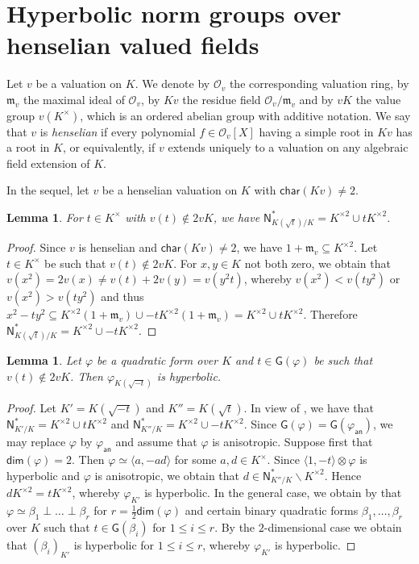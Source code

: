 \documentclass[twoside,11pt]{amsart}
\numberwithin{equation}{section}
\newtheorem{lem}[equation]{Lemma}
\theoremstyle{definition}
\renewcommand{\dim}{\operatorname{\mathsf{dim}}}
\newcommand\N{\operatorname{N}}
\newcommand{\car}{\mathsf{char}}
\newcommand{\mg}[1]{{#1}^{\times}}
\newcommand{\sq}[1]{{#1}^{\times 2}}
\newcommand{\la}{\langle}
\newcommand{\ra}{\rangle}
\newcommand{\an}{\mathsf{an}}
\renewcommand{\leq}{\leqslant}
\newcommand{\mc}{\mathcal}
\renewcommand{\N}{\mathsf{N}}
\newcommand{\G}{\mathsf{G}}
\renewcommand{\setminus}{\smallsetminus}
\renewcommand{\dim}{\mathsf{dim}}
\renewcommand{\leq}{\leqslant}
\newcommand{\mf}{\mathfrak}
\newcommand{\mfm}{\mf{m}}
\renewcommand{\setminus}{\smallsetminus}
\begin{document}
\section{Hyperbolic norm groups over henselian valued fields} %
\label{S:henselian-stuff}

Let $v$ be a valuation on $K$.
We denote by $\mc{O}_v$ the corresponding valuation ring, by $\mfm_v$ the maximal ideal of $\mc{O}_v$, by $Kv$ the residue field $\mc{O}_v/\mfm_v$ and by
$vK$ the value group $v(\mg{K})$, which is an ordered abelian group with additive notation.
We say that $v$ is \emph{henselian} if 
every polynomial $f\in\mc{O}_v[X]$ having a simple root in $Kv$ has a root in $K$, or equivalently, if $v$ extends uniquely to a valuation on any algebraic field extension of $K$.
\medskip

In the sequel, let $v$ be a henselian valuation on $K$ with $\car(Kv)\neq 2$.

\begin{lem}\label{rigid-norms}
    For $t\in\mg{K}$ with $v(t)\notin 2vK$, we have $\N_{K(\sqrt{t})/K}^\ast=\sq{K}\cup t\sq{K}$.
\end{lem}
\begin{proof}
    Since $v$ is henselian and $\car(Kv)\neq 2$, we have $1+\mfm_v\subseteq\sq{K}$.
    Let $t\in\mg{K}$ be such that $v(t)\notin 2vK$.
    For $x,y\in K$ not both zero, we obtain that $v(x^2)=2v(x)\neq v(t)+2v(y)=v(y^2t)$, whereby $v(x^2)<v(ty^2)$ or $v(x^2)>v(ty^2)$ and thus $x^2-ty^2\subseteq \sq{K}(1+\mfm_v)\cup -t\sq{K}(1+\mfm_v)=\sq{K}\cup t\sq{K}$.
    Therefore $\N_{K(\sqrt{t})/K}^\ast=\sq{K}\cup -t\sq{K}$.
\end{proof}

\begin{lem}\label{L:hens-rigid-simfactors}
    Let $\varphi$ be a quadratic form over $K$ and $t\in\G(\varphi)$ be such that 
    $v(t)\notin 2vK$. Then $\varphi_{K(\sqrt{-t})}$ is hyperbolic.
\end{lem}
\begin{proof}  
   Let $K'=K(\sqrt{-t})$ and $K''=K(\sqrt{t})$.
   In view of , we have that 
   $\N_{K'/K}^\ast=\sq{K}\cup t\sq{K}$ and $\N_{K''/K}^\ast=\sq{K}\cup-t\sq{K}$.
    Since $\G(\varphi)=\G(\varphi_\an)$, we may replace $\varphi$ by $\varphi_\an$ and assume that $\varphi$ is anisotropic. 
   Suppose first that $\dim (\varphi)=2$.
   Then $\varphi\simeq \la a,-ad\ra$ for some $a,d\in\mg{K}$.
    Since $\la 1,-t\ra\otimes \varphi$ is hyperbolic and $\varphi$ is anisotropic, we obtain that $d\in\N^\ast_{K''/K}\setminus\sq{K}$. 
    Hence $d\sq{K}=t\sq{K}$, whereby $\varphi_{K'}$ is hyperbolic.  
   In the general case, we obtain by \cite[Cor.~2.3]{EL73} that $\varphi\simeq \beta_1\perp\ldots\perp\beta_r$ for $r=\frac{1}2\dim(\varphi)$ and certain binary quadratic forms $\beta_1,\dots,\beta_r$ over $K$ such that $t\in\G(\beta_i)$ for $1\leq i\leq r$.
   By the $2$-dimensional case we obtain that $(\beta_i)_{K'}$ is hyperbolic for $1\leq i\leq r$, whereby $\varphi_{K'}$ is hyperbolic.
\end{proof}
\end{document}
